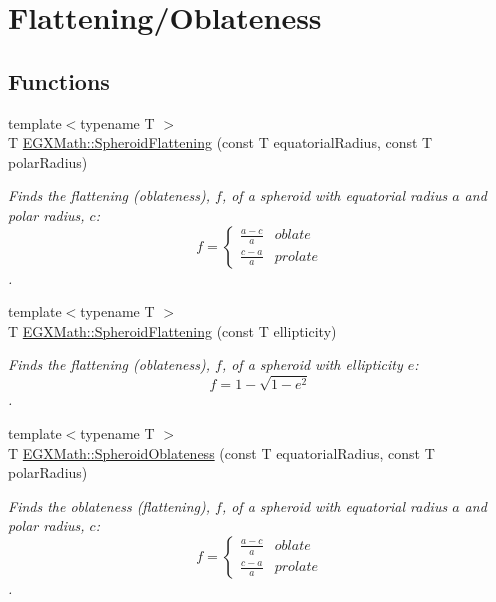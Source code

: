 \hypertarget{group___e_g_x_math-_geometry-3_d-_spheroid-_flattening}{}\section{Flattening/\+Oblateness}
\label{group___e_g_x_math-_geometry-3_d-_spheroid-_flattening}
\subsection*{Functions}
\begin{DoxyCompactItemize}
\item 
{\footnotesize template$<$typename T $>$ }\\T \mbox{\hyperlink{group___e_g_x_math-_geometry-3_d-_spheroid-_flattening_ga640f4bcd86aa4c378819bffda31c0852}{E\+G\+X\+Math\+::\+Spheroid\+Flattening}} (const T equatorial\+Radius, const T polar\+Radius)
\begin{DoxyCompactList}\small\item\em Finds the flattening (oblateness), $f$, of a spheroid with equatorial radius $a$ and polar radius, $c$\+: \[ f =\begin{cases} \frac{a-c}{a}{} & oblate \\ \frac{c-a}{a} & prolate \end{cases} \]. \end{DoxyCompactList}\item 
{\footnotesize template$<$typename T $>$ }\\T \mbox{\hyperlink{group___e_g_x_math-_geometry-3_d-_spheroid-_flattening_gacd0d1ae60af3a7f1a09ed2f65636c132}{E\+G\+X\+Math\+::\+Spheroid\+Flattening}} (const T ellipticity)
\begin{DoxyCompactList}\small\item\em Finds the flattening (oblateness), $f$, of a spheroid with ellipticity $e$\+: \[ f = 1 - \sqrt{1-e^2} \]. \end{DoxyCompactList}\item 
{\footnotesize template$<$typename T $>$ }\\T \mbox{\hyperlink{group___e_g_x_math-_geometry-3_d-_spheroid-_flattening_ga8f547f5dd10721862b602c7769eb6116}{E\+G\+X\+Math\+::\+Spheroid\+Oblateness}} (const T equatorial\+Radius, const T polar\+Radius)
\begin{DoxyCompactList}\small\item\em Finds the oblateness (flattening), $f$, of a spheroid with equatorial radius $a$ and polar radius, $c$\+: \[ f =\begin{cases} \frac{a-c}{a}{} & oblate \\ \frac{c-a}{a} & prolate \end{cases} \]. \end{DoxyCompactList}\item 

\end{DoxyCompactItemize}
